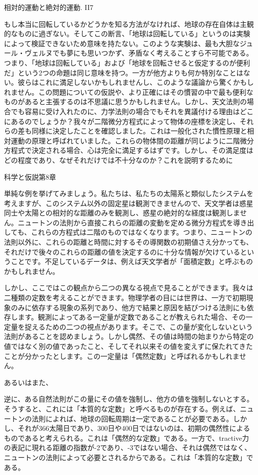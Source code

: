\documentclass[a4paper,11pt,openany]{ltjsbook}
\begin{document}
相対的運動と絶対的運動. II7

もし本当に回転しているかどうかを知る方法がなければ、地球の存在自体は主観的なものに過ぎない。そしてこの断言、「地球は回転している」というのは実験によって検証できないため意味を持たない。このような実験は、最も大胆なジュール・ヴェルヌでも夢にも思いつかず、矛盾なく考えることすら不可能である。つまり、「地球は回転している」および「地球を回転させると仮定するのが便利だ」という2つの命題は同じ意味を持つ。一方が他方よりも何か特別なことはない。彼らはこれに満足しないかもしれませんし、このような議論から驚くかもしれません。この問題についての仮説や、より正確にはその慣習の中で最も便利なものがあると主張するのは不思議に思うかもしれません。しかし、天文法則の場合でも容易に受け入れたのに、力学法則の場合でもそれを異議付ける理由はどこにあるのでしょうか？我々が二階微分方程式によって物体の座標を決定し、それらの差も同様に決定したことを確認しました。これは一般化された慣性原理と相対運動の原理と呼ばれていました。これらの物体間の距離が同じように二階微分方程式で決定される場合、心は完全に満足するはずです。しかし、その満足度はどの程度であり、なぜそれだけでは不十分なのか？これを説明するために

科学と仮説第8章


単純な例を挙げてみましょう。私たちは、私たちの太陽系と類似したシステムを考えますが、このシステム以外の固定星は観測できませんので、天文学者は惑星同士や太陽との相対的な距離のみを観測し、惑星の絶対的な経度は観測しません。ニュートンの法則から直接これらの距離の変動を定める微分方程式を導き出しても、これらの方程式は二階のものではなくなります。つまり、ニュートンの法則以外に、これらの距離と時間に対するその導関数の初期値さえ分かっても、それだけで後々のこれらの距離の値を決定するのに十分な情報が欠けているということです。不足しているデータは、例えば天文学者が「面積定数」と呼ぶものかもしれません。

しかし、ここではこの観点から二つの異なる視点で見ることができます。我々は二種類の定数を考えることができます。物理学者の目には世界は、一方で初期現象のみに依存する現象の系列であり、他方で結果と原因を結びつける法則にも依存します。観測によってある一定量が定数であることが教えられた場合、その一定量を捉えるための二つの視点があります。そこで、この量が変化しないという法則があることを認めましょう。しかし偶然、その値は時間の始まりから特定の値ではなく別の値であったこと、そしてそれ以来その値を変えずに保たれてきたことが分かったとします。この一定量は「偶然定数」と呼ばれるかもしれません。

あるいはまた、

逆に、ある自然法則がこの量にその値を強制し、他方の値を強制しないとする。そうすると、これには「本質的な定数」と呼べるものが存在する。例えば、ニュートンの法則によれば、地球の回転周期は一定であることが必要である。しかし、それが366太陽日であり、300日や400日ではないのは、初期の偶然性によるものであると考えられる。これは「偶然的な定数」である。一方で、tractive力の表記に現れる距離の指数が-2であり、-3ではない場合、それは偶然ではなく、ニュートンの法則によって必要とされるからである。これは「本質的な定数」である。
\end{document}
